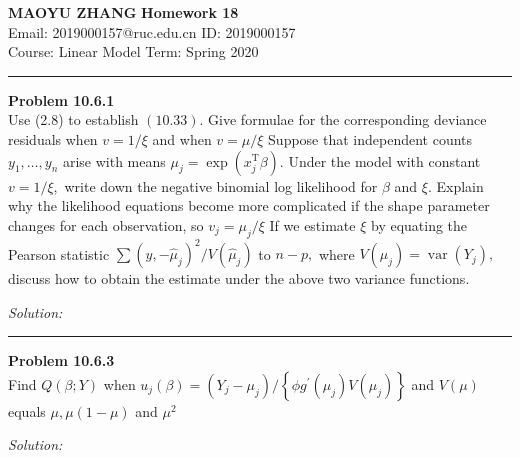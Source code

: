 \documentclass[a4paper, 11pt]{article}
\newenvironment{problem}[2][Problem]
    { \begin{mdframed}[backgroundcolor=gray!20] \textbf{#1 #2} \\}
    {  \end{mdframed}}
\newenvironment{solution}
    {\textit{Solution:}}
    {}
\begin{document}
\noindent
\large\textbf{MAOYU ZHANG} \hfill \textbf{Homework 18}   \\
Email: 2019000157@ruc.edu.cn \hfill ID: 2019000157 \\
\normalsize Course: Linear Model   \hfill Term: Spring 2020\\
\noindent\rule{7in}{2.8pt}


\begin{problem}{10.6.1}
  Use (2.8) to establish $(10.33) .$ Give formulae for the corresponding deviance residuals when $v=1 / \xi$ and when $v=\mu / \xi$ Suppose that independent counts $y_{1}, \ldots, y_{n}$ arise with means $\mu_{j}=\exp \left(x_{j}^{\mathrm{T}} \beta\right) .$ Under the model with constant $v=1 / \xi,$ write down the negative binomial log likelihood for $\beta$ and
$\xi .$ Explain why the likelihood equations become more complicated if the shape parameter changes for each observation, so $v_{j}=\mu_{j} / \xi$ If we estimate $\xi$ by equating the Pearson statistic $\sum\left(y,-\widehat{\mu}_{j}\right)^{2} / V\left(\widehat{\mu}_{j}\right)$ to $n-p,$ where $V\left(\mu_{j}\right)=\operatorname{var}\left(Y_{j}\right),$ discuss how to obtain the estimate under the above two variance functions.

\end{problem}
\begin{solution}



\end{solution}

\noindent\rule{7in}{2.8pt}

\begin{problem}{10.6.3}
Find $Q(\beta ; Y)$ when $u_{j}(\beta)=\left(Y_{j}-\mu_{j}\right) /\left\{\phi g^{\prime}\left(\mu_{j}\right) V\left(\mu_{j}\right)\right\}$ and $V(\mu)$ equals $\mu, \mu(1-\mu)$ and $\mu^{2}$
\end{problem}
\begin{solution}



\end{solution}
\end{document}
